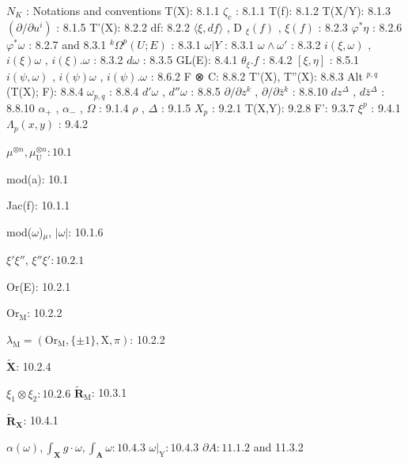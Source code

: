 
\(N_{K}\) : Notations and conventions T(X): 8.1.1 \(\zeta_{c}\) : 8.1.1 T(f): 8.1.2 T(X/Y): 8.1.3 \((\partial/\partial u^{i})\) : 8.1.5 T'(X): 8.2.2 df: 8.2.2 \(\langle\xi, df\rangle\) , D \(_{\xi}(f)\) , \(\xi(f)\) : 8.2.3 \(\varphi^{*}\eta\) : 8.2.6 \(\varphi^{*}\omega\) : 8.2.7 and 8.3.1 \(^{k}\Omega^{p}(U; E)\) : 8.3.1 \(\omega|Y\) : 8.3.1 \(\omega\wedge\omega'\) : 8.3.2 \(i(\xi,\omega)\) , \(i(\xi)\omega\) , \(i(\xi).\omega\) : 8.3.2 \(d\omega\) : 8.3.5 GL(E): 8.4.1 \(\theta_{\xi}.f\) : 8.4.2 \([\xi,\eta]\) : 8.5.1 \(i(\psi,\omega)\) , \(i(\psi)\omega\) , \(i(\psi).\omega\) : 8.6.2 F ⊗ C: 8.8.2 T'(X), T''(X): 8.8.3 Alt \(^{p,q}\) (T(X); F): 8.8.4 \(\omega_{p,q}\) : 8.8.4 \(d'\omega\) , \(d''\omega\) : 8.8.5 \(\partial/\partial z^{k}\) , \(\partial/\partial\bar{z}^{k}\) : 8.8.10 \(dz^{\Delta}\) , \(d\bar{z}^{\Delta}\) : 8.8.10 \(\alpha_{+}\) , \(\alpha_{-}\) , \(\Omega\) : 9.1.4 \(\rho\) , \(\Delta\) : 9.1.5 \(X_{p}\) : 9.2.1 T(X,Y): 9.2.8 F': 9.3.7 \(\xi^{p}\) : 9.4.1 \(\Lambda_{p}(x,y)\) : 9.4.2

\(\mu^{\otimes n}, \mu_{\mathrm{U}}^{\otimes n}: 10.1\)

mod(a): 10.1

Jac(f): 10.1.1

mod(\(\omega\))\(_{\mu}\), \(|\omega|\): 10.1.6

\(\xi'\xi''\), \(\xi''\xi': 10.2.1\)

Or(E): 10.2.1

\(\mathrm{Or}_{\mathrm{M}}\): 10.2.2

\(\lambda_{\mathrm{M}} = (\mathrm{Or}_{\mathrm{M}}, \{\pm 1\}, \mathrm{X}, \pi)\): 10.2.2

\(\tilde{\mathbf{X}}\): 10.2.4

\(\xi_1 \otimes \xi_2: 10.2.6\) \(\tilde{\mathbf{R}}_{\mathrm{M}}\): 10.3.1

\(\tilde{\mathbf{R}}_{\mathbf{X}}\): 10.4.1

\(\alpha(\omega), \int_{\mathbf{X}} g \cdot \omega, \int_{\mathbf{A}} \omega: 10.4.3\) \(\omega|_{\mathrm{Y}}: 10.4.3\) \(\partial A: 11.1.2\) and 11.3.2

